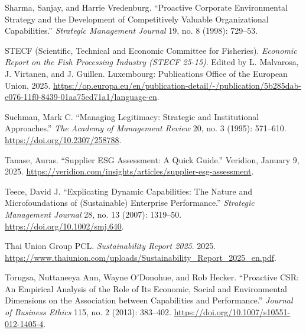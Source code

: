 Sharma, Sanjay, and Harrie Vredenburg. ``Proactive Corporate Environmental Strategy and the Development of Competitively Valuable Organizational Capabilities.'' \emph{Strategic Management Journal} 19, no. 8 (1998): 729--53.

STECF (Scientific, Technical and Economic Committee for Fisheries). \emph{Economic Report on the Fish Processing Industry (STECF 25-15)}. Edited by L. Malvarosa, J. Virtanen, and J. Guillen. Luxembourg: Publications Office of the European Union, 2025. \url{https://op.europa.eu/en/publication-detail/-/publication/5b285dab-e076-11f0-8439-01aa75ed71a1/language-en}. %

Suchman, Mark C. ``Managing Legitimacy: Strategic and Institutional Approaches.'' \emph{The Academy of Management Review} 20, no. 3 (1995): 571--610. \url{https://doi.org/10.2307/258788}.

Tanase, Auras. ``Supplier ESG Assessment: A Quick Guide.'' Veridion, January 9, 2025. \url{https://veridion.com/insights/articles/supplier-esg-assessment}. %

Teece, David J. ``Explicating Dynamic Capabilities: The Nature and Microfoundations of (Sustainable) Enterprise Performance.'' \emph{Strategic Management Journal} 28, no. 13 (2007): 1319--50. \url{https://doi.org/10.1002/smj.640}. %

Thai Union Group PCL. \emph{Sustainability Report 2025}. 2025. \url{https://www.thaiunion.com/uploads/Sustainability\_Report\_2025\_en.pdf}. %

Torugsa, Nuttaneeya Ann, Wayne O'Donohue, and Rob Hecker. ``Proactive CSR: An Empirical Analysis of the Role of Its Economic, Social and Environmental Dimensions on the Association between Capabilities and Performance.'' \emph{Journal of Business Ethics} 115, no. 2 (2013): 383--402. \url{https://doi.org/10.1007/s10551-012-1405-4}.

